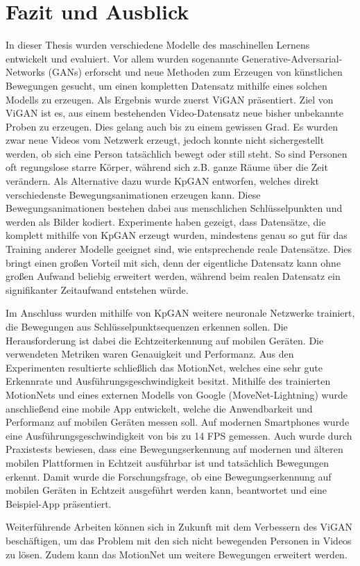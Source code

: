 \chapter{Fazit und Ausblick}
In dieser Thesis wurden verschiedene Modelle des maschinellen Lernens entwickelt
und evaluiert. Vor allem wurden sogenannte Generative-Adversarial-Networks
(GANs) erforscht und neue Methoden zum Erzeugen von künstlichen Bewegungen
gesucht, um einen kompletten Datensatz mithilfe eines solchen Modells zu
erzeugen. Als Ergebnis wurde zuerst ViGAN präsentiert. Ziel von ViGAN ist es,
aus einem bestehenden Video-Datensatz neue bisher unbekannte Proben zu erzeugen.
Dies gelang auch bis zu einem gewissen Grad. Es wurden zwar neue Videos vom
Netzwerk erzeugt, jedoch konnte nicht sichergestellt werden, ob sich eine Person
tatsächlich bewegt oder still steht.  So sind Personen oft regungslose starre
Körper, während sich z.B. ganze Räume über die Zeit verändern. Als Alternative
dazu wurde KpGAN entworfen, welches direkt verschiedenste Bewegungsanimationen
erzeugen kann. Diese Bewegungsanimationen bestehen dabei aus menschlichen
Schlüsselpunkten und werden als Bilder kodiert.  Experimente haben gezeigt, dass
Datensätze, die komplett mithilfe von KpGAN erzeugt wurden, mindestens genau so
gut für das Training anderer Modelle geeignet sind, wie entsprechende reale
Datensätze.  Dies bringt einen großen Vorteil mit sich, denn der eigentliche
Datensatz kann ohne großen Aufwand beliebig erweitert werden, während beim
realen Datensatz ein signifikanter Zeitaufwand entstehen würde.

Im Anschluss wurden mithilfe von KpGAN weitere neuronale Netzwerke trainiert,
die Bewegungen aus Schlüsselpunktsequenzen erkennen sollen.  Die Herausforderung
ist dabei die Echtzeiterkennung auf mobilen Geräten. Die verwendeten Metriken
waren Genauigkeit und Performanz. Aus den Experimenten resultierte schließlich
das MotionNet, welches eine sehr gute Erkennrate und Ausführungsgeschwindigkeit
besitzt.  Mithilfe des trainierten MotionNets und eines externen Modells von
Google (MoveNet-Lightning) wurde anschließend eine mobile App entwickelt, welche
die Anwendbarkeit und Performanz auf mobilen Geräten messen soll. Auf modernen
Smartphones wurde eine Aus\-führ\-ungs\-ge\-schwindig\-keit von bis zu 14 FPS
gemessen. Auch wurde durch Praxistests bewiesen, dass eine Bewegungserkennung
auf modernen und älteren mobilen Plattformen in Echtzeit ausführbar ist und
tatsächlich Bewegungen erkennt. Damit wurde die Forschungsfrage, ob eine Bewegungserkennung auf mobilen Geräten in Echtzeit ausgeführt werden kann, beantwortet und eine Beispiel-App präsentiert.

Weiterführende Arbeiten können sich in Zukunft mit dem Verbessern des ViGAN
be\-schäf\-tigen, um das Problem mit den sich nicht bewegenden Personen in
Videos zu lösen. Zudem kann das MotionNet um weitere Bewegungen erweitert
werden.
